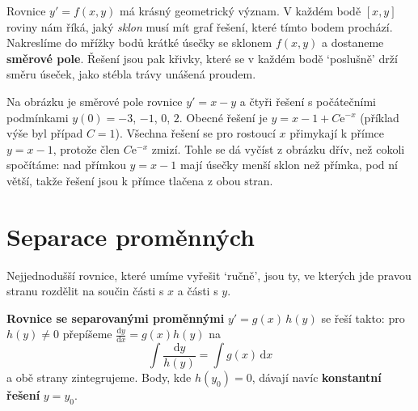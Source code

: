 Rovnice $y' = f(x, y)$ má krásný geometrický význam. V každém bodě $[x, y]$ roviny nám říká, jaký \textit{sklon} musí mít graf řešení, které tímto bodem prochází. Nakreslíme do mřížky bodů krátké úsečky se sklonem $f(x, y)$ a dostaneme \textbf{směrové pole}. Řešení jsou pak křivky, které se v každém bodě `poslušně' drží směru úseček, jako stébla trávy unášená proudem.

\begin{center}
\end{center}

Na obrázku je směrové pole rovnice $y' = x - y$ a čtyři řešení s počátečními podmínkami $y(0) = -3$, $-1$, $0$, $2$. Obecné řešení je $y = x - 1 + C\mathrm{e}^{-x}$ (příklad výše byl případ $C = 1$). Všechna řešení se pro rostoucí $x$ přimykají k přímce $y = x - 1$, protože člen $C\mathrm{e}^{-x}$ zmizí. Tohle se dá vyčíst z obrázku dřív, než cokoli spočítáme: nad přímkou $y = x - 1$ mají úsečky menší sklon než přímka, pod ní větší, takže řešení jsou k přímce tlačena z obou stran.

\section{Separace proměnných}

Nejjednodušší rovnice, které umíme vyřešit `ručně', jsou ty, ve kterých jde pravou stranu rozdělit na součin části s $x$ a části s $y$.

\begin{definitionbox}
  \textbf{Rovnice se separovanými proměnnými} $y' = g(x)\,h(y)$ se řeší takto: pro $h(y)\neq 0$ přepíšeme $\frac{\mathrm{d}y}{\mathrm{d}x} = g(x)h(y)$ na
  \begin{equation*}
    \int\frac{\mathrm{d}y}{h(y)} = \int g(x)\,\mathrm{d}x
  \end{equation*}
  a obě strany zintegrujeme. Body, kde $h(y_0) = 0$, dávají navíc \textbf{konstantní řešení} $y = y_0$.
\end{definitionbox}

